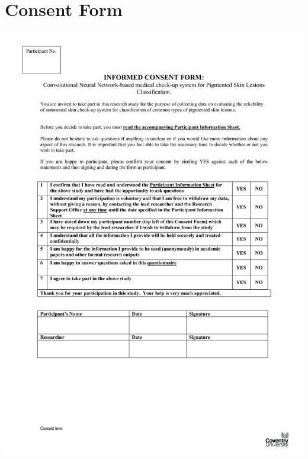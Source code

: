 \section*{Consent Form}
\begin{center}
    \includegraphics[width=\textwidth]{Documents/consent.pdf}
\end{center}

